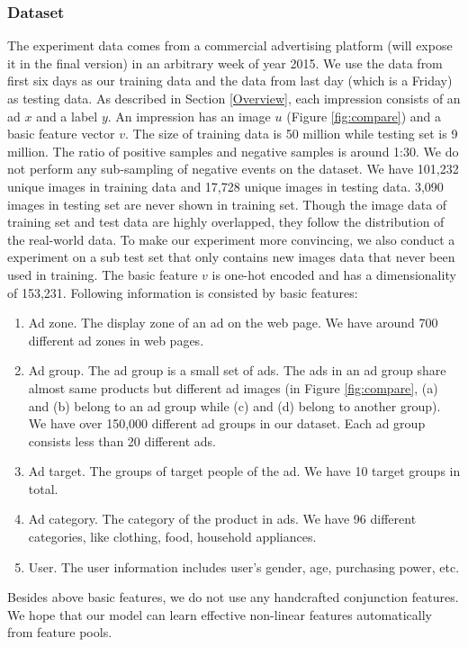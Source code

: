 \documentclass{sig-alternate-05-2015}
\begin{document}
\subsubsection{Dataset}
The experiment data comes from a commercial advertising platform (will expose it in the final version) in an  arbitrary  week of year 2015. We use the data from first six days as our training data and the data from last day (which is a Friday) as testing data.  As described in Section \ref{Overview}, each impression consists of an ad $x$ and a label $y$.  An impression has an image $u$ (Figure \ref{fig:compare}) and a basic feature vector $v$.  The size of training data is 50 million while testing set is 9 million. The ratio of positive samples and negative samples is around 1:30.   We do not perform any sub-sampling of negative events on the dataset. We have 101,232 unique images in training data and 17,728 unique images in testing data. 3,090 images in testing set are never shown in training set. Though the image data of training set and test data are highly overlapped, they follow the distribution of the real-world data. To make our experiment more convincing, we also conduct a experiment on a sub test set that only contains new images data that never been used in training.  The basic feature $v$ is one-hot encoded and has a dimensionality of 153,231. Following information is consisted by basic features:
\begin{enumerate}
	\item Ad zone. The display zone of an ad on the web page. We have around 700 different ad zones in web pages.
	\item Ad group. The ad group is a small set of ads. The ads in an ad group share almost same  products but different ad images (in Figure \ref{fig:compare}, (a) and (b) belong to an ad group while (c) and (d) belong to another group). We have over 150,000 different ad groups in our dataset. Each ad group consists less than 20 different   ads.
	\item Ad target. The groups of target people of the ad.  We have 10 target groups in total.
	\item Ad category. The category of the product in ads. We have 96 different categories, like clothing, food, household appliances. 
	\item User. The user information includes user's gender, age, purchasing power, etc. 
\end{enumerate}
Besides above basic features, we do not use any handcrafted conjunction features. We hope that  our model can learn  effective non-linear features automatically from feature pools.
\end{document}
